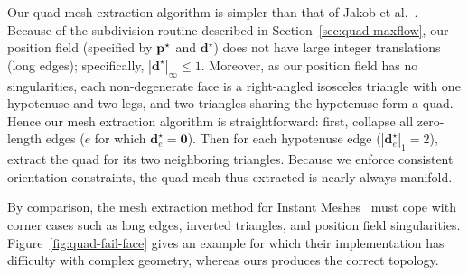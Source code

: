Our quad mesh extraction algorithm is simpler than that of Jakob et al.~\cite{jakob2015instant}. Because of the subdivision routine described in Section~\ref{sec:quad-maxflow}, our position field (specified by $\mathbf{p}^{\star}$ and ${\textbf{d}}^{\star}$) does not have large integer translations (long edges); specifically, $|{\textbf{d}}^{\star}|_{\infty} \leq 1$. Moreover, as our position field has no singularities, each non-degenerate face is a right-angled isosceles triangle with one hypotenuse and two legs, and two triangles sharing the hypotenuse form a quad.  Hence our mesh extraction algorithm is straightforward: first, collapse all zero-length edges ($e$ for which ${\textbf{d}}_e^{\star} = \textbf{0}$). Then for each hypotenuse edge ($|{\textbf{d}}_e^{\star}|_1 = 2$), extract the quad for its two neighboring triangles. Because we enforce consistent orientation constraints, the quad mesh thus extracted is nearly always manifold. %

By comparison, the mesh extraction method for Instant Meshes~\cite{jakob2015instant} must cope with corner cases such as long edges, inverted triangles, and position field singularities. Figure~\ref{fig:quad-fail-face} gives an example for which their implementation has difficulty with complex geometry, whereas ours produces the correct topology.

